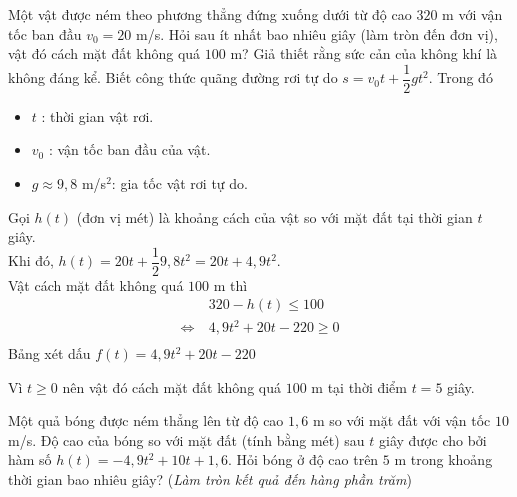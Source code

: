 \begin{bt}%
	Một vật được ném theo phương thẳng đứng xuống dưới từ độ cao $320$ m với vận tốc ban đầu $v_0 = 20$ m/s. Hỏi sau ít nhất bao nhiêu giây (làm tròn đến đơn vị), vật đó cách mặt đất không quá $100$ m? Giả thiết rằng sức cản của không khí là không đáng kể. Biết công thức quãng đường rơi tự do $s = v_0t+\dfrac{1}{2}gt^2$. Trong đó
	\begin{itemize}
		\item $t$ : thời gian vật rơi.
		\item $v_0$ : vận tốc ban đầu của vật.
		\item $g \approx 9{,}8$ m/s$^2$: gia tốc vật rơi tự do.
	\end{itemize}
	\loigiai
	{
		Gọi $h(t)$ (đơn vị mét) là khoảng cách của vật so với mặt đất tại thời gian $t$ giây.\\
		Khi đó, $h(t) = 20t + \dfrac{1}{2}9{,}8t^2 = 20t + 4{,}9t^2$.\\
		Vật cách mặt  đất không quá $100$ m thì
		\begin{align*}
			\ &320 - h(t) \le 100\\
			\Leftrightarrow\ & 4{,}9t^2 + 20t -220 \ge 0\\
		\end{align*}
		Bảng xét dấu $f(t) = 4{,}9t^2 + 20t -220$
		\begin{center}
		\end{center}
		Vì $t \ge 0$ nên vật đó cách mặt đất không quá $100$ m tại thời điểm $t = 5$ giây.
	}
\end{bt}

\begin{bt}%
	Một quả bóng được ném thẳng lên từ độ cao $1{,}6$ m so với mặt đất với vận tốc $10$ m/s. Độ cao của bóng so với mặt đất (tính bằng mét) sau $t$ giây được cho bởi hàm số $h(t)=-4{,}9t^2+10t+1{,}6$. Hỏi bóng ở độ cao trên $5$ m trong khoảng thời gian bao nhiêu giây? (\textit{Làm tròn kết quả đến hàng phần trăm})
\end{bt}

